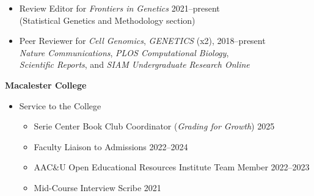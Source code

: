 \documentclass[margin]{res}
\begin{document}
\begin{resume}
\begin{itemize}
	\item Review Editor for \textit{Frontiers in Genetics}   \hfill 2021--present \\ (Statistical Genetics and Methodology section)
	\item Peer Reviewer for \textit{Cell Genomics}, \textit{GENETICS} (x2),   \hfill 2018--present \\ \textit{Nature Communications}, \textit{PLOS Computational Biology},  \\ \textit{Scientific Reports},  and \textit{SIAM Undergraduate Research Online} 
	\end{itemize}
	
\newpage
\textbf{Macalester College}
	\begin{itemize} %
	\item Service to the College
		\begin{itemize}
		\item Serie Center Book Club Coordinator (\textit{Grading for Growth}) \hfill 2025
		\item Faculty Liaison to Admissions \hfill 2022--2024 %
		\item AAC\&U Open Educational Resources Institute Team Member \hfill 2022--2023
		\item Mid-Course Interview Scribe \hfill 2021 
		\end{itemize}
		

\end{itemize}
\end{resume}
\end{document}
